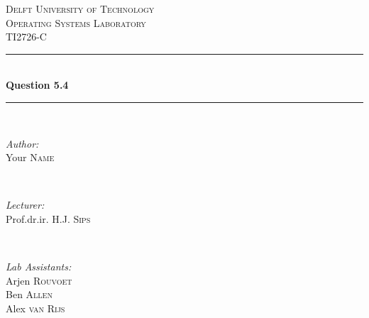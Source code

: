 \documentclass[12pt]{article}
\begin{document}
\begin{titlepage}

\newcommand{\HRule}{\rule{\linewidth}{0.5mm}} %

\center %
 

\textsc{\LARGE Delft University of Technology}\\[1.5cm] %
\textsc{\Large Operating Systems Laboratory}\\[0.5cm] %
\textsc{\large TI2726-C}\\[0.5cm] %


\HRule \\[0.4cm]
{ \huge \bfseries Question 5.4}\\[0.4cm] %
\HRule \\[1.5cm]
 

\begin{minipage}{0.4\textwidth}
\begin{flushleft} \large
\emph{Author:}\\
Your \textsc{Name} %
\end{flushleft}
\end{minipage}
~
\begin{minipage}{0.4\textwidth}
\begin{flushright} \large
\emph{Lecturer:} \\
Prof.dr.ir. H.J. \textsc{Sips} %
\end{flushright}
\end{minipage}\\[1cm]

\begin{minipage}{0.4\textwidth}
\begin{flushleft} \large
\emph{Lab Assistants:}\\
Arjen \textsc{Rouvoet}\\
Ben \textsc{Allen}\\
Alex \textsc{van Rijs} %
\end{flushleft}
\end{minipage}
~
\begin{minipage}{0.4\textwidth}
\begin{flushright} \large


\end{flushright}
\end{minipage}
\end{titlepage}
\end{document}
